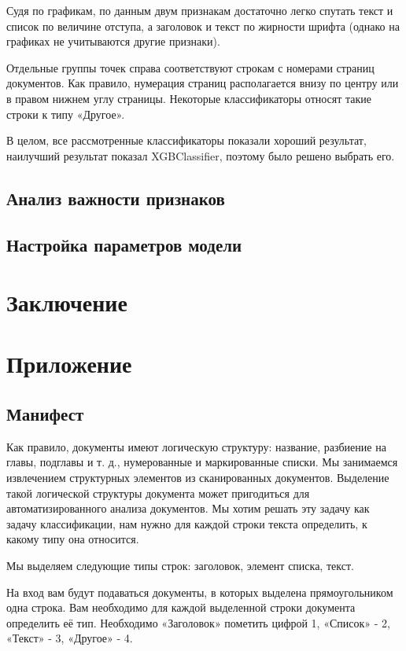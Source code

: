 \documentclass[a4paper,12pt]{article}
\begin{document}
Судя по графикам, по данным двум признакам достаточно легко спутать текст и список по величине отступа, а заголовок и текст по жирности шрифта (однако на графиках не учитываются другие признаки).

Отдельные группы точек справа соответствуют строкам с номерами страниц документов. Как правило, нумерация страниц располагается внизу по центру или в правом нижнем углу страницы. Некоторые классификаторы относят такие строки к типу «Другое».

В целом, все рассмотренные классификаторы показали хороший результат, наилучший результат показал XGBClassifier, поэтому было решено выбрать его.

\subsection{Анализ важности признаков}



\subsection{Настройка параметров модели}



\newpage
\section{Заключение}

\newpage
\section{Приложение}

\subsection{Манифест}


Как правило, документы имеют логическую структуру: название, разбиение на главы, подглавы и т. д., нумерованные и маркированные списки. Мы занимаемся извлечением структурных элементов из сканированных документов. Выделение такой логической структуры документа может пригодиться для автоматизированного анализа документов. Мы хотим решать эту задачу как задачу классификации, нам нужно для каждой строки текста определить, к какому типу она относится.

Мы выделяем следующие типы строк: заголовок, элемент списка, текст.

На вход вам будут подаваться документы, в которых выделена прямоугольником одна строка. Вам необходимо для каждой выделенной строки документа определить её тип. Необходимо «Заголовок» пометить цифрой 1, «Список» - 2, «Текст» - 3, «Другое» - 4.
\end{document}
